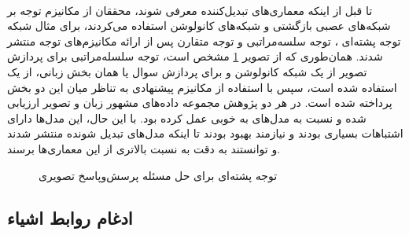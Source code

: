 \paragraph{}{
    تا قبل از اینکه معماری‌های تبدیل‌کننده معرفی شوند،‌ محققان از مکانیزم توجه
    بر شبکه‌های عصبی بازگشتی و شبکه‌های کانولوشن استفاده می‌کردند، برای مثال
    شبکه‌ توجه پشته‌ای
    \cite{yang2016stacked}
    ،
    توجه سلسه‌مراتبی 
    \cite{NIPS2016_9dcb88e0}
    و 
    توجه متقارن
    \cite{nguyen2018improved}
    پس از ارائه مکانیزم‌های توجه منتشر شدند.
    همان‌طوری که از تصویر 
    \ref{fig:stacked_attention}
    مشخص است، توجه سلسله‌مراتبی 
    برای پردازش تصویر از یک شبکه‌ کانولوشن و برای پردازش سوال یا 
    همان بخش زبانی، از یک 
    استفاده شده است، سپس با استفاده از مکانیزم پیشنهادی به تناظر میان این دو بخش
    پرداخته شده است. در هر دو پژوهش مجموعه داده‌های مشهور زبان و تصویر 
    ارزیابی شده‌ و نسبت به مدل‌های 
    به خوبی عمل کرده بود. با این‌ حال، این مدل‌ها دارای اشتباهات بسیاری بودند و 
    نیازمند بهبود بودند تا اینکه مدل‌های تبدیل شونده منتشر شدند و 
    توانستند به دقت به نسبت بالاتری از این معماری‌ها برسند.
    \begin{figure}[H]
        \caption{توجه پشته‌ای برای حل مسئله پرسش‌وپاسخ تصویری}
        \label{fig:stacked_attention}
    \end{figure}
}

\subsection{
    ادغام روابط اشیاء
}
\label{sec:object_relation_approach}
